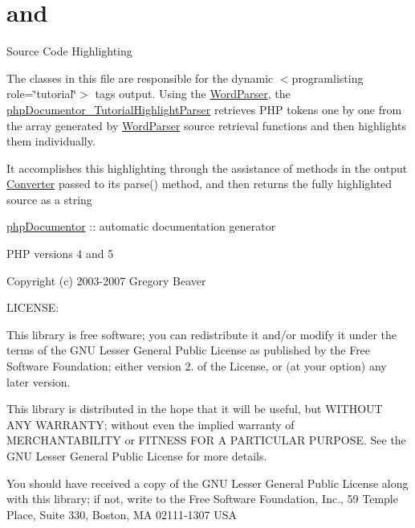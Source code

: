 \hypertarget{and-example}{\section{and}
}
\-Source \-Code \-Highlighting

\-The classes in this file are responsible for the dynamic $<$programlisting role=\char`\"{}tutorial\char`\"{}$>$ tags output. \-Using the \hyperlink{class_word_parser}{\-Word\-Parser}, the \hyperlink{classphp_documentor___tutorial_highlight_parser}{php\-Documentor\-\_\-\-Tutorial\-Highlight\-Parser} retrieves \-P\-H\-P tokens one by one from the array generated by \hyperlink{class_word_parser}{\-Word\-Parser} source retrieval functions and then highlights them individually.

\-It accomplishes this highlighting through the assistance of methods in the output \hyperlink{class_converter}{\-Converter} passed to its parse() method, and then returns the fully highlighted source as a string

\hyperlink{namespacephp_documentor}{php\-Documentor} \-:\-: automatic documentation generator

\-P\-H\-P versions 4 and 5

\-Copyright (c) 2003-\/2007 \-Gregory \-Beaver

\-L\-I\-C\-E\-N\-S\-E\-:

\-This library is free software; you can redistribute it and/or modify it under the terms of the \-G\-N\-U \-Lesser \-General \-Public \-License as published by the \-Free \-Software \-Foundation; either version 2. of the \-License, or (at your option) any later version.

\-This library is distributed in the hope that it will be useful, but \-W\-I\-T\-H\-O\-U\-T \-A\-N\-Y \-W\-A\-R\-R\-A\-N\-T\-Y; without even the implied warranty of \-M\-E\-R\-C\-H\-A\-N\-T\-A\-B\-I\-L\-I\-T\-Y or \-F\-I\-T\-N\-E\-S\-S \-F\-O\-R \-A \-P\-A\-R\-T\-I\-C\-U\-L\-A\-R \-P\-U\-R\-P\-O\-S\-E. \-See the \-G\-N\-U \-Lesser \-General \-Public \-License for more details.

\-You should have received a copy of the \-G\-N\-U \-Lesser \-General \-Public \-License along with this library; if not, write to the \-Free \-Software \-Foundation, \-Inc., 59 \-Temple \-Place, \-Suite 330, \-Boston, \-M\-A 02111-\/1307 \-U\-S\-A


\begin{DoxyCodeInclude}
\end{DoxyCodeInclude}
 